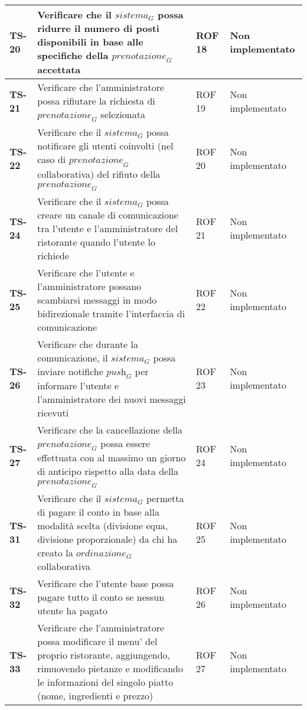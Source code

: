 \begin{longtable}{|>{\centering\arraybackslash}p{1.5cm}|p{9.8cm}|p{2cm}|p{3.5cm}|}
    \hline
    \rowcolor{gray!10}
    \textbf{TS-20} & Verificare che il $\textit{sistema}_G$ possa ridurre il numero di posti disponibili in base alle specifiche della $\textit{prenotazione}_G$ accettata & ROF 18 & Non implementato \\ 
    \hline
    \rowcolor{gray!10}
    \textbf{TS-21} & Verificare che l'amministratore possa rifiutare la richiesta di $\textit{prenotazione}_G$ selezionata & ROF 19 & Non implementato \\ 
    \hline
    \rowcolor{gray!10}
    \textbf{TS-22} & Verificare che il $\textit{sistema}_G$ possa notificare gli utenti coinvolti (nel caso di $\textit{prenotazione}_G$ collaborativa) del rifiuto della $\textit{prenotazione}_G$ & ROF 20 & Non implementato \\ 
    \hline
    \rowcolor{gray!10}
    \textbf{TS-24} & Verificare che il $\textit{sistema}_G$ possa creare un canale di comunicazione tra l'utente e l'amministratore del ristorante quando l'utente lo richiede & ROF 21 & Non implementato \\
    \hline
    \rowcolor{gray!10}
    \textbf{TS-25} & Verificare che l'utente e l'amministratore possano scambiarsi messaggi in modo bidirezionale tramite l'interfaccia di comunicazione & ROF 22 & Non implementato \\ 
    \hline 
    \rowcolor{gray!10}
    \textbf{TS-26} & Verificare che durante la comunicazione, il $\textit{sistema}_G$ possa inviare notifiche $\textit{push}_G$ per informare l'utente e l'amministratore dei nuovi messaggi ricevuti & ROF 23 & Non implementato \\ 
    \hline
    \rowcolor{gray!10}
    \textbf{TS-27} & Verificare che la cancellazione della $\textit{prenotazione}_G$ possa essere effettuata con al massimo un giorno di anticipo rispetto alla data della $\textit{prenotazione}_G$ & ROF 24 & Non implementato \\
    \hline
    \rowcolor{gray!10}
    \textbf{TS-31} & Verificare che il $\textit{sistema}_G$ permetta di pagare il conto in base alla modalità scelta (divisione equa, divisione proporzionale) da chi ha creato la $\textit{ordinazione}_G$ collaborativa & ROF 25 & Non implementato \\
    \hline
    \rowcolor{gray!10}
    \textbf{TS-32} & Verificare che l'utente base possa pagare tutto il conto se nessun utente ha pagato & ROF 26 & Non implementato \\
    \hline
    \rowcolor{gray!10}
    \textbf{TS-33} & Verificare che l'amministratore possa modificare il menu' del proprio ristorante, aggiungendo, rimuovendo pietanze e modificando le informazioni del singolo piatto (nome, ingredienti e prezzo) & ROF 27 & Non implementato \\

\end{longtable}
